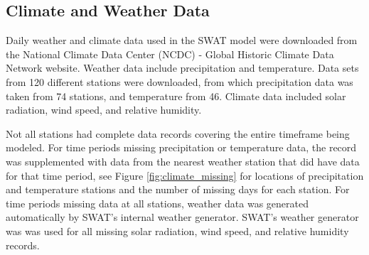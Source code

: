 \subsection{Climate and Weather Data}\label{sec:climate_data}

Daily weather and climate data used in the SWAT model were downloaded from the National Climate Data Center (NCDC) - Global Historic Climate Data Network website. Weather data include precipitation and temperature.  Data sets from 120 different stations were downloaded, from which precipitation data was taken from 74 stations, and temperature from 46. Climate data included solar radiation, wind speed, and relative humidity.   

Not all stations had complete data records covering the entire timeframe being modeled.  For time periods missing precipitation or temperature data, the record was supplemented with data from the nearest weather station that did have data for that time period, see Figure \ref{fig:climate_missing} for locations of precipitation and temperature stations and the number of missing days for each station.   For time periods missing data at all stations, weather data was generated automatically by SWAT's internal weather generator.  SWAT's weather generator was was used for all missing solar radiation, wind speed, and relative humidity records. 
